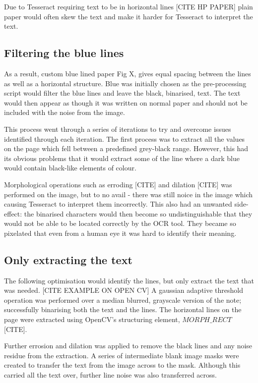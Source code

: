 Due to Tesseract requiring text to be in horizontal lines [CITE HP PAPER] plain paper would often skew the text and make it harder for Tesseract to interpret the text.
\subsection{Filtering the blue lines}
As a result, custom blue lined paper Fig X, gives equal spacing between the lines as well as a horizontal structure. Blue was initially chosen as the pre-processing script would filter the blue lines and leave the black, binarised, text. The text would then appear as though it was written on normal paper and should not be included with the noise from the image.

This process went through a series of iterations to try and overcome issues identified through each iteration. The first process was to extract all the values on the page which fell between a predefined grey-black range. However, this had its obvious problems that it would extract some of the line where a dark blue would contain black-like elements of colour.

Morphological operations such as erroding [CITE] and dilation [CITE] was performed on the image, but to no avail - there was still noice in the image which causing Tesseract to interpret them incorrectly. This also had an unwanted side-effect: the binarised characters would then become so undistinguishable that they would not be able to be located correctly by the OCR tool. They became so pixelated that even from a human eye it was hard to identify their meaning.

\subsection{Only extracting the text}
The following optimisation would identify the lines, but only extract the text that was needed.
[CITE EXAMPLE ON OPEN CV]
A gaussian adaptive threshold operation was performed over a median blurred, grayscale version of the note; successfully binarising both the text and the lines. The horizontal lines on the page were extracted using OpenCV's structuring element, $MORPH\_RECT$ [CITE].

Further errosion and dilation was applied to remove the black lines and any noise residue from the extraction. A series of intermediate blank image masks were created to transfer the text from the image across to the mask. Although this carried all the text over, further line noise was also transferred across.

